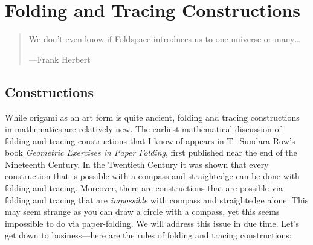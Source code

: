\chapter{Folding and Tracing Constructions}
\begin{quote} 
We don't even know if Foldspace introduces us to one universe or
many\dots

\hfill---Frank Herbert
\end{quote}

\section{Constructions}
While origami as an art form is quite ancient, folding and tracing constructions
in mathematics are relatively new. The earliest mathematical
discussion of folding and tracing constructions that I know of appears in
T.\ Sundara Row's book \textit{Geometric Exercises in Paper Folding},%
first published near the end of the Nineteenth Century. In
the Twentieth Century it was shown that every construction that is
possible with a compass and straightedge can be done with
folding and tracing. Moreover, there are constructions that are possible via
folding and tracing that are \textit{impossible} with compass and straightedge
alone. This may seem strange as you can draw a circle with a compass,
yet this seems impossible to do via paper-folding. We will address
this issue in due time. Let's get down to business---here are the
rules of folding and tracing constructions:


